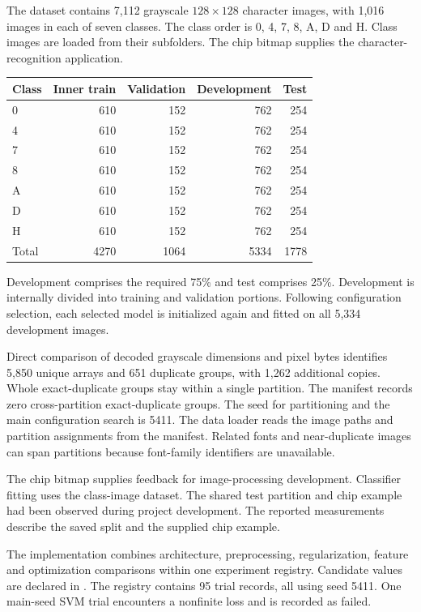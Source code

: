 The dataset contains 7,112 grayscale $128\times128$ character images, with 1,016 images in each of seven classes. The class order is 0, 4, 7, 8, A, D and H. Class images are loaded from their subfolders. The chip bitmap supplies the character-recognition application.
\begin{center}\begin{tabular}{lrrrr}\toprule
Class & Inner train & Validation & Development & Test\\\midrule
0 & 610 & 152 & 762 & 254\\
4 & 610 & 152 & 762 & 254\\
7 & 610 & 152 & 762 & 254\\
8 & 610 & 152 & 762 & 254\\
A & 610 & 152 & 762 & 254\\
D & 610 & 152 & 762 & 254\\
H & 610 & 152 & 762 & 254\\\midrule
Total & 4270 & 1064 & 5334 & 1778\\\bottomrule
\end{tabular}\end{center}
Development comprises the required 75\% and test comprises 25\%. Development is internally divided into training and validation portions. Following configuration selection, each selected model is initialized again and fitted on all 5,334 development images.

Direct comparison of decoded grayscale dimensions and pixel bytes identifies 5,850 unique arrays and 651 duplicate groups, with 1,262 additional copies. Whole exact-duplicate groups stay within a single partition. The manifest records zero cross-partition exact-duplicate groups. The seed for partitioning and the main configuration search is 5411. The data loader reads the image paths and partition assignments from the manifest. Related fonts and near-duplicate images can span partitions because font-family identifiers are unavailable.

The chip bitmap supplies feedback for image-processing development. Classifier fitting uses the class-image dataset. The shared test partition and chip example had been observed during project development. The reported measurements describe the saved split and the supplied chip example.

The implementation combines architecture, preprocessing, regularization, feature and optimization comparisons within one experiment registry. Candidate values are declared in . The registry contains 95 trial records, all using seed 5411. One main-seed SVM trial encounters a nonfinite loss and is recorded as failed.

